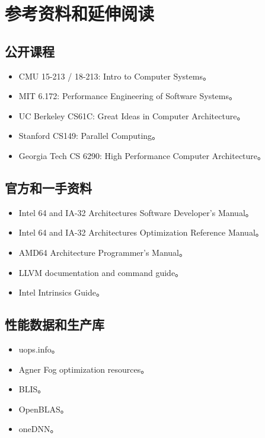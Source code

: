 \chapter{参考资料和延伸阅读}

\section{公开课程}

\begin{itemize}
  \item CMU 15-213 / 18-213: Intro to Computer Systems。
  \item MIT 6.172: Performance Engineering of Software Systems。
  \item UC Berkeley CS61C: Great Ideas in Computer Architecture。
  \item Stanford CS149: Parallel Computing。
  \item Georgia Tech CS 6290: High Performance Computer Architecture。
\end{itemize}

\section{官方和一手资料}

\begin{itemize}
  \item Intel 64 and IA-32 Architectures Software Developer's Manual。
  \item Intel 64 and IA-32 Architectures Optimization Reference Manual。
  \item AMD64 Architecture Programmer's Manual。
  \item LLVM documentation and  command guide。
  \item Intel Intrinsics Guide。
\end{itemize}

\section{性能数据和生产库}

\begin{itemize}
  \item uops.info。
  \item Agner Fog optimization resources。
  \item BLIS。
  \item OpenBLAS。
  \item oneDNN。
\end{itemize}
